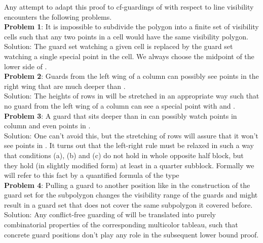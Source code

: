 \documentclass[a4paper,USenglish,numberwithinsect]{lipics}
\theoremstyle{plain}
\begin{document}
Any attempt to adapt  this proof to cf-guardings of 
with respect to line
visibility encounters the following  problems. \\
{\bf  Problem 1}: It is impossible to subdivide the polygon into a finite set of
visibility cells such that any two points
in a cell would have the same visibility polygon.\\
Solution: The guard set watching a given cell  is replaced by
the guard set watching a  single special
point in the cell.
We always choose the midpoint  of the lower side of .\\
{\bf  Problem 2}: Guards from the left wing of a column  can possibly see points
in the right wing that are much deeper than
.\\
Solution:
 The heights of  rows in  will be stretched in an
appropriate way such that no
guard from the left wing of a column  can see a special  point  with
 and .\\
{\bf  Problem 3}: A guard that sits deeper than  in   can possibly watch
points in column  and even points in .\\
Solution: One can't avoid this, but the stretching of  rows will assure that it won't see
points in .
It turns out that the left-right rule must be relaxed in such a way that
conditions (a), (b) and (c)
do not hold in whole opposite half block, but they hold (in slightly
modified form) at least in a quarter
subblock. Formally we will refer to this fact by a quantified formula of
the type
\\
{\bf  Problem 4}: Pulling a guard to another position like in the construction of
the guard set  for the subpolygon 
changes the visibility range of the guards and might result in a guard
set that does not cover the same subpolygon it
covered before.\\
Solution: Any conflict-free guarding of  will be translated into  purely
combinatorial properties of
the corresponding multicolor tableau, such that
concrete  guard positions don't play any role in the subsequent lower bound proof.
\end{document}
